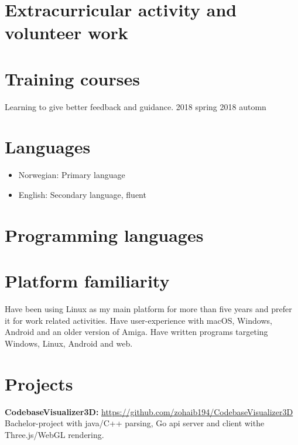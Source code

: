 \documentclass[british]{crudecv/crudecv}
\begin{document}
\section*{Extracurricular activity and volunteer work}
\begin{experiences}
\end{experiences}

\section*{Training courses}
\begin{experiences}
	{
		Learning to give better feedback and guidance.
	}{
		2018 spring
	}{ 
		2018 automn
	}
\end{experiences}

\section*{Languages}
\begin{itemize}
    \item Norwegian: Primary language
    \item English: Secondary language, fluent
\end{itemize}


\section*{Programming languages}
\begin{skills}
\end{skills}


\section*{Platform familiarity}
Have been using Linux as my main platform for more than five years and prefer it for work related activities. Have user-experience with macOS, Windows, Android and an older version of Amiga. Have written programs targeting Windows, Linux, Android and web.

\section*{Projects}
\textbf{CodebaseVisualizer3D:} \hfill \href{https://github.com/zohaib194/CodebaseVisualizer3D}{https://github.com/zohaib194/CodebaseVisualizer3D} \\
Bachelor-project with java/C++ parsing, Go api server and client withe Three.js/WebGL rendering.
\end{document}
